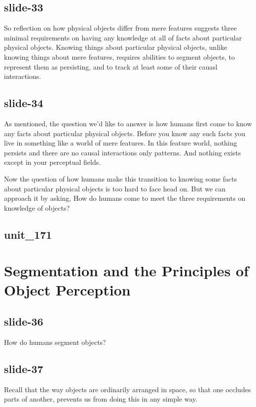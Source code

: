 \documentclass[12pt,\papersize]{extarticle}
\begin{document}
\subsection{slide-33}
So reflection on how physical objects differ from mere features suggests three minimal 
requirements on having any knowledge at all of facts about particular physical objects.
Knowing things about particular physical objects, unlike knowing things about mere features, 
requires abilities to segment objects, to represent them as persisting, and to track at least 
some of their cauasl interactions.
 
\subsection{slide-34}
As mentioned, the question we'd like to answer is how humans first come to know any facts about
particular physical objects.
Before you know any such facts you live in something like a world of mere features.
In this feature world, nothing persists and there are no causal interactions only patterns.
And nothing exists except in your perceptual fields.
 
Now the question of how humans make this transition to knowing some facts about particular 
physical objects is too hard to face head on.  But we can approach it by asking,
How do humans come to meet the three requirements on knowledge of objects?
 
\subsection{unit\_171}
 
 
\section{Segmentation and the Principles of Object Perception}
 
\subsection{slide-36}
How do humans segment objects?
 
\subsection{slide-37}
Recall that the way objects are ordinarily arranged in space, so that one occludes parts of another, prevents us from doing this in any simple way.
 
\end{document}
